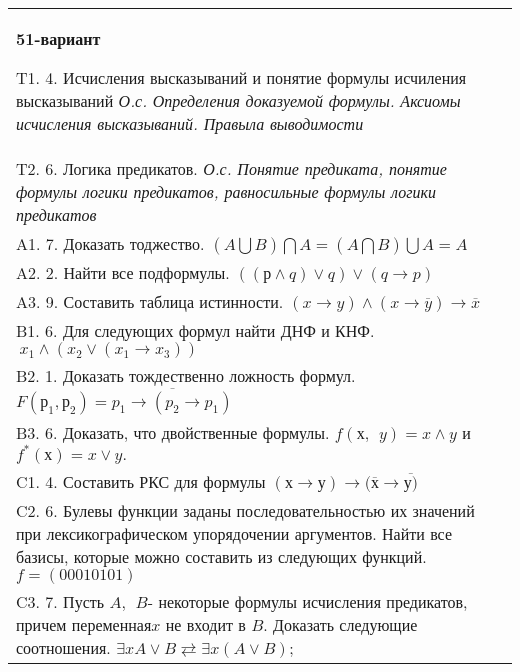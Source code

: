 \documentclass{article}
\begin{document}
\begin{tabular}{m{17cm}}
\textbf{51-вариант}
\newline

T1. 4. Исчисления высказываний и понятие формулы исчиления высказываний \emph{О.с. Определения доказуемой формулы. Аксиомы исчисления высказываний. Правыла выводимости} \\
T2. 6. Логика предикатов. \emph{О.с. Понятие предиката, понятие формулы логики предикатов, равносильные формулы логики предикатов} \\
A1. 7. Доказать тоджество. \((A\bigcup B)\bigcap A = (A\bigcap B)\bigcup A = A\) \\
A2. 2. Найти все подформулы. \(\left( (р \land q) \vee q \right) \vee (q \rightarrow p)\) \\
A3. 9. Составить таблица истинности. \((x \rightarrow y) \land (x \rightarrow \overline{y}) \rightarrow \overline{x}\) \\
B1. 6. Для следующих формул найти ДНФ и КНФ. \(\ x_{1} \land (x_{2} \vee (x_{1} \rightarrow x_{3}))\) \\
B2. 1. Доказать тождественно ложность формул. \(F\left( р_{1},р_{2} \right) = \overline{p_{1} \rightarrow (p_{2} \rightarrow p_{1})}\) \\
B3. 6. Доказать, что двойственные формулы. \(f(х,\ \ y) = x \land y\) и \(f^{*}(х) = x \vee y.\) \\
C1. 4. Составить РКС для формулы \((х \rightarrow у) \rightarrow (\overline{х} \rightarrow \overline{у)}\) \\
C2. 6. Булевы функции заданы последовательностью их значений при лексикографическом упорядочении аргументов. Найти все базисы, которые можно составить из следующих функций. \(f = (00010101)\) \\
C3. 7. Пусть \(A,\ \ B\)- некоторые формулы исчисления предикатов, причем переменная\(x\) не входит в \(B\). Доказать следующие соотношения. \(\exists xA \vee B \rightleftarrows \exists x(A \vee B)\); \\

\end{tabular}
\vspace{1cm}
\end{document}
